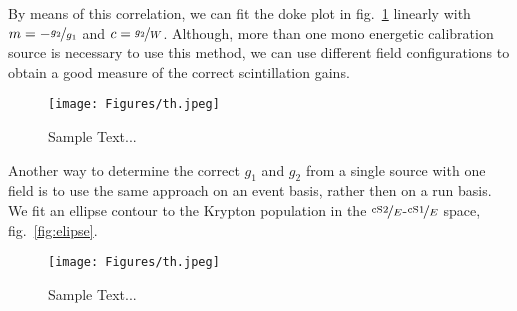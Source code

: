 By means of this correlation, we can fit the doke plot in fig.~\ref{fig:doke} linearly with $ m = - \nicefrac{g_2}{g_1} $ and $ c = \nicefrac{g_2}{W} $.  %
Although, more than one mono energetic calibration source is necessary to use this method, we can use different field configurations to obtain a good measure of the correct scintillation gains.

\begin{figure}
\centering
\texttt{[image: Figures/th.jpeg]}  %
\caption[Doke plot]{
        Sample Text...
    }
\label{fig:doke}
\end{figure}

Another way to determine the correct $ g_1 $ and $ g_2 $ from a single source with one field is to use the same approach on an event basis, rather then on a run basis.
We fit an ellipse contour to the Krypton population in the $ \nicefrac{\mathrm{cS2}}{E} $-$ \nicefrac{\mathrm{cS1}}{E} $ space, fig.~\ref{fig:elipse}.

\begin{figure}
\centering
\texttt{[image: Figures/th.jpeg]}  %
\caption[Ellipse Fit]{
        Sample Text...
    }
\label{fig:ellipse}
\end{figure}



